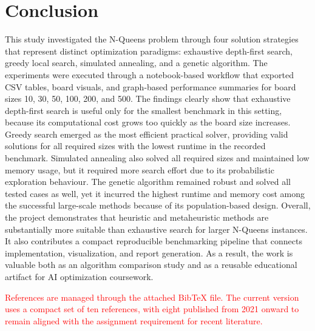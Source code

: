 \documentclass[conference]{IEEEtran}
\begin{document}
\section{Conclusion}
This study investigated the N-Queens problem through four solution strategies that represent distinct optimization paradigms: exhaustive depth-first search, greedy local search, simulated annealing, and a genetic algorithm. The experiments were executed through a notebook-based workflow that exported CSV tables, board visuals, and graph-based performance summaries for board sizes 10, 30, 50, 100, 200, and 500. The findings clearly show that exhaustive depth-first search is useful only for the smallest benchmark in this setting, because its computational cost grows too quickly as the board size increases. Greedy search emerged as the most efficient practical solver, providing valid solutions for all required sizes with the lowest runtime in the recorded benchmark. Simulated annealing also solved all required sizes and maintained low memory usage, but it required more search effort due to its probabilistic exploration behaviour. The genetic algorithm remained robust and solved all tested cases as well, yet it incurred the highest runtime and memory cost among the successful large-scale methods because of its population-based design. Overall, the project demonstrates that heuristic and metaheuristic methods are substantially more suitable than exhaustive search for larger N-Queens instances. It also contributes a compact reproducible benchmarking pipeline that connects implementation, visualization, and report generation. As a result, the work is valuable both as an algorithm comparison study and as a reusable educational artifact for AI optimization coursework.

\textcolor{red}{References are managed through the attached BibTeX file. The current version uses a compact set of ten references, with eight published from 2021 onward to remain aligned with the assignment requirement for recent literature.}



\end{document}

